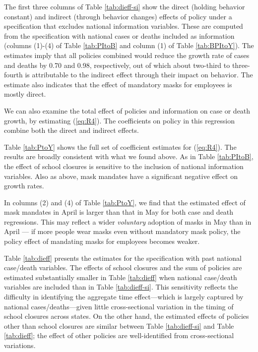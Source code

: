 \documentclass[11pt,reqno,letter]{amsart}
\theoremstyle{definition}
\begin{document}
The first three columns of Table \ref{tab:dieff-si} show the direct
(holding behavior constant) and indirect (through behavior changes)
effects of policy under a specification that excludes national information variables. These are computed from the specification with
national cases or deaths included as information (columns (1)-(4) of
Table \ref{tab:PItoB} and column (1) of Table \ref{tab:BPItoY}). The estimates imply
that all policies combined would reduce the growth rate of cases  and deaths by
0.70 and 0.98, respectively,   out of which about two-third to
three-fourth is attributable to the indirect effect through their impact on behavior.  The estimate also indicates that the
effect of mandatory masks for employees is mostly direct.

We can also examine the total effect of policies and information on
case  or death growth, by estimating (\ref{eq:R4}). The coefficients on policy
in this regression combine both the direct and indirect effects.

Table \ref{tab:PtoY} shows
the full set of coefficient estimates for
(\ref{eq:R4}). The results are broadly consistent with what we found
above.  As in Table \ref{tab:PItoB}, the effect of school closures is
sensitive to the inclusion of national information variables.  Also as
above, mask mandates have a significant negative effect on growth
rates.

In columns (2) and (4) of Table \ref{tab:PtoY}, we find that the estimated effect of mask mandates in April is larger than that in May for both case and death regressions.  This may reflect a wider \textit{voluntary} adoption of masks in May than in April --- if more people wear masks even without mandatory mask policy,  the policy effect of mandating masks for employees becomes weaker.


Table \ref{tab:dieff} presents the estimates for the specification with past national case/death variables. The effects of school closures and  the sum of policies are estimated substantially smaller in Table \ref{tab:dieff} when national case/death variables are included than in Table \ref{tab:dieff-si}. This sensitivity reflects the difficulty in identifying the aggregate time effect---which is largely captured by national cases/deaths---given little cross-sectional variation in the timing of school closures across states. On the other hand, the estimated effects of policies other than school closures are similar between Table \ref{tab:dieff-si} and Table \ref{tab:dieff}; the effect of other policies are well-identified from cross-sectional variations.
\end{document}
